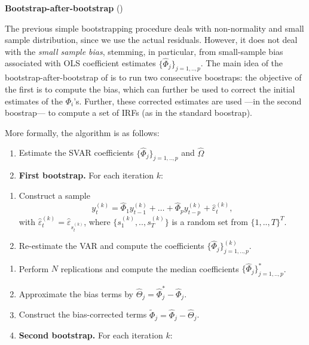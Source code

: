 \documentclass[
  12pt,
]{book}
\providecommand{\tightlist}{%
  \setlength{\itemsep}{0pt}\setlength{\parskip}{0pt}}
\theoremstyle{definition}
\theoremstyle{definition}
\theoremstyle{definition}
\theoremstyle{definition}
\theoremstyle{remark}
\begin{document}
\textbf{Bootstrap-after-bootstrap} (\citet{Kilian_1998})

The previous simple bootstrapping procedure deals with non-normality and small sample distribution, since we use the actual residuals. However, it does not deal with the \emph{small sample bias}, stemming, in particular, from small-sample bias associated with OLS coefficient estimates \(\{\widehat{\Phi}_j\}_{j=1,..,p}\). The main idea of the bootstrap-after-bootstrap of \citet{Kilian_1998} is to run two consecutive boostraps: the objective of the first is to compute the bias, which can further be used to correct the initial estimates of the \(\Phi_i\)'s. Further, these corrected estimates are used ---in the second boostrap--- to compute a set of IRFs (as in the standard boostrap).

More formally, the algorithm is as follows:

\begin{enumerate}
\def\labelenumi{\arabic{enumi}.}
\tightlist
\item
  Estimate the SVAR coefficients \(\{\widehat{\Phi}_j\}_{j=1,..,p}\) and \(\widehat{\Omega}\)
\item
  \textbf{First bootstrap.} For each iteration \(k\):
\end{enumerate}

\begin{enumerate}
\def\labelenumi{\alph{enumi}.}
\tightlist
\item
  Construct a sample
  \[
  y_t^{(k)}=\widehat{\Phi}_1 y_{t-1}^{(k)} + \dots + \widehat{\Phi}_p y_{t-p}^{(k)} + \hat\varepsilon_t^{(k)},
  \]
  with \(\hat\varepsilon_{t}^{(k)}=\hat\varepsilon_{s_t^{(k)}}\), where \(\{s_1^{(k)},..,s_T^{(k)}\}\) is a random set from \(\{1,..,T\}^T\).
\item
  Re-estimate the VAR and compute the coefficients \(\{\widehat{\Phi}_j\}_{j=1,..,p}^{(k)}\).
\end{enumerate}

\begin{enumerate}
\def\labelenumi{\arabic{enumi}.}
\setcounter{enumi}{2}
\tightlist
\item
  Perform \(N\) replications and compute the median coefficients \(\{\widehat{\Phi}_j\}_{j=1,..,p}^*\).
\item
  Approximate the bias terms by \(\widehat{\Theta}_j=\widehat{\Phi}_j^*-\widehat{\Phi}_j\).
\item
  Construct the bias-corrected terms \(\widetilde{\Phi}_j=\widehat{\Phi}_j-\widehat{\Theta}_j\).
\item
  \textbf{Second bootstrap.} For each iteration \(k\):
\end{enumerate}
\end{document}
